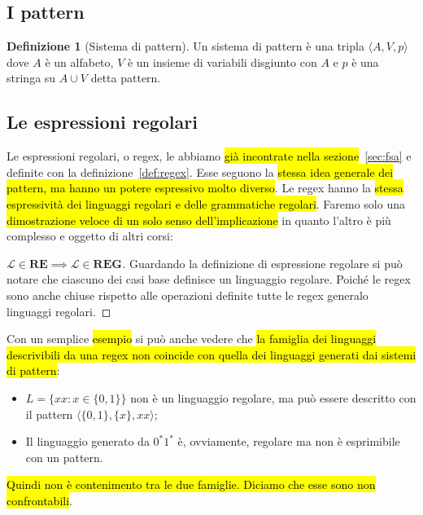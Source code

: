 \documentclass[a4paper,11pt,twoside]{article}
\theoremstyle{plain}
\theoremstyle{definition}
\newtheorem{defn}{Definizione}[section]
\theoremstyle{remark}
\begin{document}
\subsection{I pattern}\label{sec:pattern}

\begin{defn}[Sistema di pattern]
  Un sistema di pattern è una tripla $\langle A, V, p \rangle$ dove $A$ è un
  alfabeto, $V$ è un insieme di variabili disgiunto con $A$ e $p$ è una stringa
  su $A \cup V$ detta pattern.
\end{defn}

\subsection{Le espressioni regolari}\label{sec:regex}

Le espressioni regolari, o regex, le abbiamo \hl{già incontrate nella
sezione}~\ref{sec:fsa} e definite con la definizione~\ref{def:regex}. Esse
seguono la \hl{stessa idea generale dei pattern, ma hanno un potere espressivo
molto diverso}. Le regex hanno la\hl{ stessa espressività dei linguaggi regolari
e delle grammatiche regolari}. Faremo solo una \hl{dimostrazione veloce di un
solo senso dell'implicazione} in quanto l'altro è più complesso e oggetto di
altri corsi:

\begin{proof}[$\mathcal{L}\in\mathbf{RE} \implies \mathcal{L}\in\mathbf{REG}$]%
  \label{proof:equiv-re-reg-1}
  Guardando la definizione di espressione regolare si può notare che ciascuno
  dei casi base definisce un linguaggio regolare. Poiché le regex sono anche
  chiuse rispetto alle operazioni definite tutte le regex generalo linguaggi
  regolari.
\end{proof}

Con un semplice \hl{esempio} si può anche vedere che \hl{la famiglia dei
linguaggi descrivibili da una regex non coincide con quella dei linguaggi
generati dai sistemi di pattern}:

\begin{itemize}
  \item $L = \{xx : x \in \{0,1\}\}$ non è un linguaggio regolare, ma può essere
    descritto con il pattern $\langle \{0,1\}, \{x\}, xx\rangle$;
  \item Il linguaggio generato da $0^* 1^*$ è, ovviamente, regolare ma non è
    esprimibile con un pattern.
\end{itemize}

\hl{Quindi non è contenimento tra le due famiglie. Diciamo che esse sono non
confrontabili}.
\end{document}
